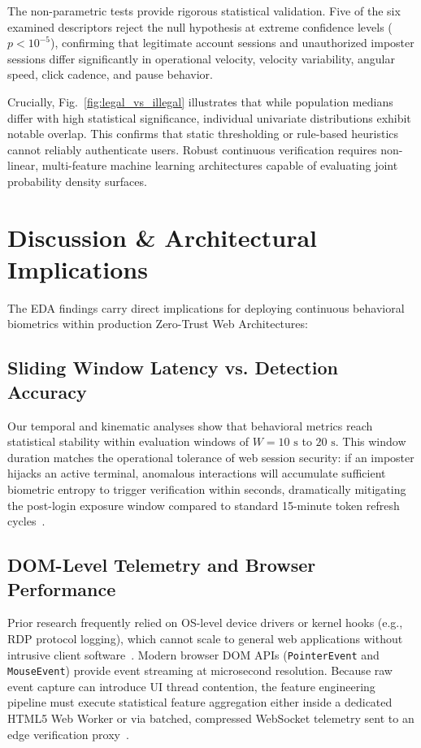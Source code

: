 \documentclass[10pt,journal,compsoc]{IEEEtran}
\begin{document}
The non-parametric tests provide rigorous statistical validation. Five of the six examined descriptors reject the null hypothesis at extreme confidence levels ($p < 10^{-5}$), confirming that legitimate account sessions and unauthorized imposter sessions differ significantly in operational velocity, velocity variability, angular speed, click cadence, and pause behavior. 

Crucially, Fig.~\ref{fig:legal_vs_illegal} illustrates that while population medians differ with high statistical significance, individual univariate distributions exhibit notable overlap. This confirms that static thresholding or rule-based heuristics cannot reliably authenticate users. Robust continuous verification requires non-linear, multi-feature machine learning architectures capable of evaluating joint probability density surfaces.

\section{Discussion \& Architectural Implications}
The EDA findings carry direct implications for deploying continuous behavioral biometrics within production Zero-Trust Web Architectures:

\subsection{Sliding Window Latency vs. Detection Accuracy}
Our temporal and kinematic analyses show that behavioral metrics reach statistical stability within evaluation windows of $W = 10\text{ s}$ to $20\text{ s}$. This window duration matches the operational tolerance of web session security: if an imposter hijacks an active terminal, anomalous interactions will accumulate sufficient biometric entropy to trigger verification within seconds, dramatically mitigating the post-login exposure window compared to standard 15-minute token refresh cycles~\cite{wang2024zerotrust, zheng2023continuous}.

\subsection{DOM-Level Telemetry and Browser Performance}
Prior research frequently relied on OS-level device drivers or kernel hooks (e.g., RDP protocol logging), which cannot scale to general web applications without intrusive client software~\cite{dave2024clicks}. Modern browser DOM APIs (\texttt{PointerEvent} and \texttt{MouseEvent}) provide event streaming at microsecond resolution. Because raw event capture can introduce UI thread contention, the feature engineering pipeline must execute statistical feature aggregation either inside a dedicated HTML5 Web Worker or via batched, compressed WebSocket telemetry sent to an edge verification proxy~\cite{roy2023optimal, kim2024scalable}.
\end{document}

